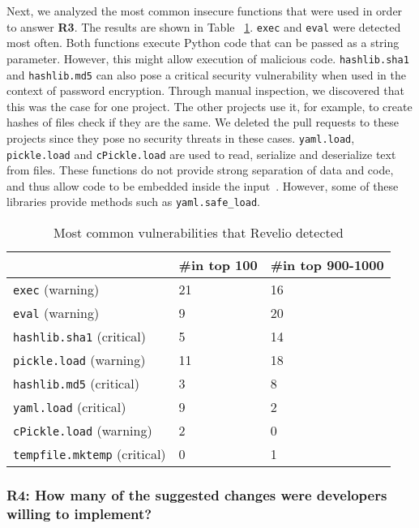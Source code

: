 Next, we analyzed the most common insecure functions that were used in order to answer \textbf{R3}. The results are shown in Table ~\ref{tab:vulnerabilities}. \texttt{exec} and \texttt{eval} were detected most often. Both functions execute Python code that can be passed as a string parameter. However, this might allow execution of malicious code. \texttt{hashlib.sha1} and \texttt{hashlib.md5} can also pose a critical security vulnerability when used in the context of password encryption. Through manual inspection, we discovered that this was the case for one project. The other projects use it, for example, to create hashes of files check if they are the same. We deleted the pull requests to these projects since they pose no security threats in these cases. \texttt{yaml.load}, \texttt{pickle.load} and \texttt{cPickle.load} are used to read, serialize and deserialize text from files. These functions do not provide strong separation of data and code, and thus allow code to be embedded inside the input~\cite{openstack}. However, some of these libraries provide methods such as \texttt{yaml.safe\_load}. 


\begin{table}[!h]
\small
  \centering
  \begin{tabular}{|p{}|p{}|p{}|}
    \hline
 & \#in top 100 & \#in top 900-1000 \\
\hline
\hline
\texttt{exec} (warning) & 21 & 16 \\
\hline
\texttt{eval} (warning) & 9 & 20 \\
\hline
\texttt{hashlib.sha1} (critical) & 5 & 14 \\
\hline
\texttt{pickle.load} (warning) & 11 & 18 \\
\hline
\texttt{hashlib.md5} (critical) & 3 & 8 \\
\hline
\texttt{yaml.load} (critical) & 9 & 2 \\
\hline
\texttt{cPickle.load} (warning) & 2 & 0 \\
\hline
\texttt{tempfile.mktemp} (critical) & 0 & 1 \\
 \hline
  \end{tabular}
  \caption{Most common vulnerabilities that Revelio detected} 
  \label{tab:vulnerabilities}
\end{table}


\subsubsection{R4: How many of the suggested changes were developers willing to implement?}




